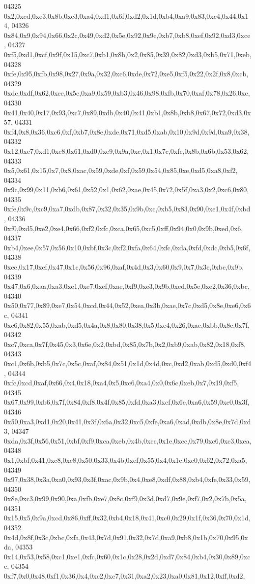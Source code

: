\begin{DoxyCode}
04325   0x2,0xed,0xe3,0x8b,0xe3,0xa4,0xd1,0x6f,0xd2,0x1d,0xb4,0xa9,0x83,0xc4,0x44,0x14,
04326   0x84,0x9,0x94,0x66,0x2c,0x49,0xd2,0x5e,0x92,0x9e,0xb7,0xb8,0xef,0x92,0xd3,0xce,
04327   0xf5,0xd1,0xcf,0x9f,0x15,0xc7,0xb1,0x8b,0x2,0x85,0x39,0x82,0xd3,0xb5,0x71,0xeb,
04328   0xfe,0x95,0xfb,0x98,0x27,0x9a,0x32,0xc6,0xde,0x72,0xe5,0xf5,0x22,0x2f,0x8,0xcb,
04329   0xdc,0xdf,0x62,0xce,0x5c,0xa9,0x59,0xb3,0x46,0x98,0xfb,0x70,0xaf,0x78,0x26,0xc,
04330   0x41,0x40,0x17,0x93,0xc7,0x89,0xdb,0x40,0x41,0xb1,0x8b,0xb8,0x67,0x72,0xd3,0x57,
04331   0xf4,0x8,0x36,0xc6,0xf,0xb7,0x8e,0xde,0x71,0xd5,0xab,0x10,0x9d,0x9d,0xa9,0x38,
04332   0x12,0xc7,0xd1,0xc8,0x61,0xd0,0xe9,0x9a,0xc,0x1,0x7c,0xfc,0x8b,0x6b,0x53,0x62,
04333   0x5,0x61,0x15,0x7,0x8,0xac,0x59,0xde,0xf,0x59,0x54,0x85,0xe,0xd5,0xa8,0xf2,
04334   0x9c,0x99,0x11,0xb6,0x61,0x52,0x1,0x62,0xae,0x45,0x72,0x5f,0xa3,0x2,0xc6,0x80,
04335   0xfe,0x9c,0xc9,0xa7,0xdb,0x87,0x32,0x35,0x9b,0xc,0xb5,0x83,0x90,0xe1,0x4f,0xbd,
04336   0xf0,0xd5,0xe2,0xe4,0x66,0xf2,0xfc,0xca,0x65,0xc5,0xff,0x94,0x0,0x9b,0xed,0x6,
04337   0xb4,0xee,0x57,0x56,0x10,0xbf,0x3c,0xf2,0xfa,0x64,0xfc,0xda,0xfd,0xdc,0xb5,0x6f,
04338   0xec,0x17,0xef,0x47,0x1c,0x56,0x96,0xaf,0x4d,0x3,0x60,0x9,0x7,0x3c,0xbc,0x9b,
04339   0x47,0x6,0xaa,0xa3,0xe1,0xe7,0xef,0xae,0xf9,0xe3,0x9b,0xed,0x5e,0xe2,0x36,0xbc,
04340   0x50,0x77,0x89,0xe7,0x54,0xcd,0x44,0x52,0xea,0x3b,0xae,0x7c,0xd5,0x8e,0xe6,0x6c,
04341   0xc6,0x82,0x55,0xab,0xd5,0x4a,0x8,0x80,0x38,0x5,0xe4,0x26,0xac,0xbb,0x8e,0x7f,
04342   0xc7,0xca,0x7f,0x45,0x3,0x6e,0x2,0xbd,0x85,0x7b,0x2,0xb9,0xab,0x82,0x18,0xf8,
04343   0xc1,0x6b,0xb5,0x7c,0x5c,0xaf,0x84,0x51,0x1d,0x4d,0xc,0xd2,0xab,0xd5,0xd0,0xf4,
04344   0xfc,0xcd,0xaf,0x66,0x4,0x18,0xa4,0x5,0xc6,0xa4,0x0,0x6c,0xeb,0x7,0x19,0xf5,
04345   0x67,0x99,0xb6,0x7f,0x84,0xf8,0x4f,0x85,0xfd,0xa3,0xcf,0x6e,0xa6,0x59,0xc0,0x3f,
04346   0x50,0xa3,0xd1,0x20,0x41,0x3f,0x6a,0x32,0xc5,0xfe,0xa6,0xad,0xdb,0x8e,0x7d,0xd3,
04347   0xda,0x3f,0x56,0x51,0xbf,0xf9,0xca,0xeb,0x4b,0xcc,0x1e,0xcc,0x79,0xc6,0xc3,0xea,
04348   0x1,0xbf,0x41,0xc8,0xc8,0x50,0x33,0x4b,0xef,0x55,0x4,0x1c,0xc0,0x62,0x72,0xa5,
04349   0x97,0x38,0x3a,0xa0,0x93,0x3f,0xac,0x9b,0x4,0xe8,0xdf,0x88,0xb4,0xfe,0x33,0x59,
04350   0x8e,0xc3,0x99,0x90,0xa,0xfb,0xe7,0x8c,0xf9,0x3d,0xd7,0x9e,0xf7,0x2,0x7b,0x5a,
04351   0x15,0x5,0x9a,0xcd,0x86,0xff,0x32,0xb4,0x18,0x41,0xc0,0x29,0x1f,0x36,0x70,0x1d,
04352   0x4d,0x8f,0x3c,0xbc,0xfa,0x43,0x7d,0x91,0x32,0x7d,0xa9,0xb8,0x1b,0x70,0x95,0xda,
04353   0x14,0x53,0x58,0xc1,0xe1,0xfc,0x60,0x1c,0x28,0x2d,0xd7,0x84,0xb4,0x30,0x89,0xcc,
04354   0xf7,0x0,0x48,0xf1,0x36,0x4,0xc2,0xc7,0x31,0xa2,0x23,0xa0,0x81,0x12,0xff,0xd2,

\end{DoxyCode}
